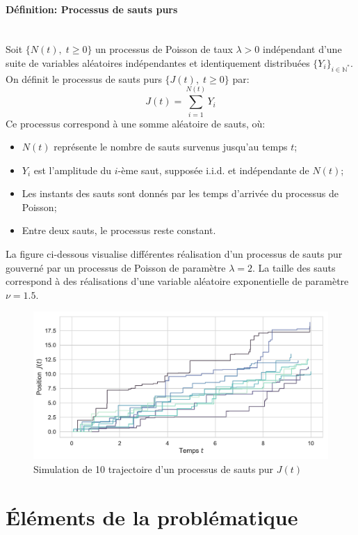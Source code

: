 \paragraph{Définition: Processus de sauts purs}\mbox{}\\
Soit $\{N(t),\;t \geq 0\}$ un processus de Poisson de taux $\lambda > 0$ indépendant d'une suite de variables aléatoires indépendantes et identiquement distribuées $\{Y_i\}_{i \in \mathbb{N}^*}$. On définit le processus de sauts purs $\{J(t),\;t \geq 0\}$ par:
\[
J(t) = \sum_{i=1}^{N(t)} Y_i
\]
Ce processus correspond à une somme aléatoire de sauts, où:
\begin{itemize}
    \item $N(t)$ représente le nombre de sauts survenus jusqu'au temps $t$;
    \item $Y_i$ est l'amplitude du $i$-ème saut, supposée i.i.d. et indépendante de $N(t)$;
    \item Les instants des sauts sont donnés par les temps d'arrivée du processus de Poisson;
    \item Entre deux sauts, le processus reste constant.
\end{itemize}
La figure ci-dessous visualise différentes réalisation d'un processus de sauts pur gouverné par un processus de Poisson de paramètre $\lambda=2$. La taille des sauts correspond à des réalisations d'une variable aléatoire exponentielle de paramètre $\nu=1.5$.
\begin{figure}[htb]
    \centering
    \includegraphics[width=0.9\linewidth]{img/intro/path_jump.pdf}
    \caption{Simulation de 10 trajectoire d'un processus de sauts pur $J(t)$}\label{fig:TrajJump}
\end{figure}
\FloatBarrier\clearpage

\section{Éléments de la problématique}  %

